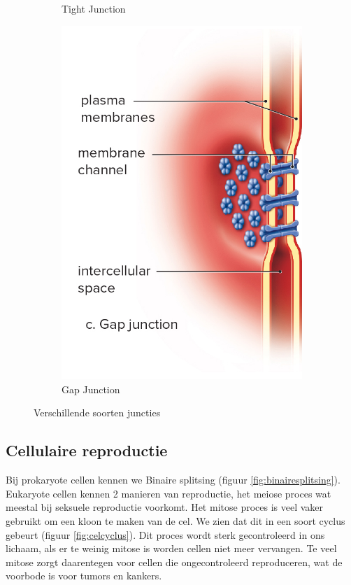 \documentclass[a4paper,kul]{kulakarticle} %
\begin{document}
\begin{figure}[h]
\begin{subfigure}{.33\textwidth}
		\caption{Tight Junction}
		\label{fig:Tight}
	\end{subfigure}%
	\begin{subfigure}{.33\textwidth}
	\centering
	\includegraphics[width=0.7\linewidth]{Gap_Junctie}
	\caption{Gap Junction}
	\label{fig:Gap}
	\end{subfigure}
	\caption{Verschillende soorten juncties}
	\label{fig:Juncites}
\end{figure}
\subsection{Cellulaire reproductie}
Bij prokaryote cellen kennen we Binaire splitsing (figuur \ref{fig:binairesplitsing}). Eukaryote cellen kennen 2 manieren van reproductie, het meiose proces wat meestal bij seksuele reproductie voorkomt. Het mitose proces is veel vaker gebruikt om een kloon te maken van de cel. We zien dat dit in een soort cyclus gebeurt (figuur \ref{fig:celcyclus}). Dit proces wordt sterk gecontroleerd in ons lichaam, als er te weinig mitose is worden cellen niet meer vervangen. Te veel mitose zorgt daarentegen voor cellen die ongecontroleerd reproduceren, wat de voorbode is voor tumors en kankers.  
\end{document}
